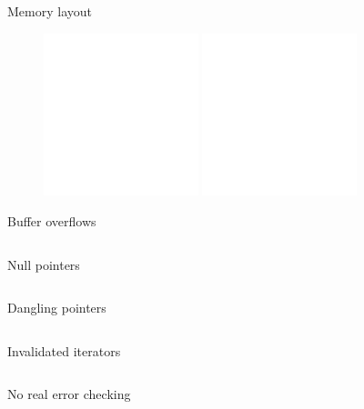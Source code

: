\documentclass[usenames,dvipsnames,10pt,aspectratio=169]{beamer}
\begin{document}
\begin{frame}{Memory layout} 

\begin{figure}[ht]
	\includegraphics[width=0.4\textwidth]{graphics/stack1.png}
  \hfill
	\includegraphics[width=0.4\textwidth]{graphics/stack2.png}
	\hfill
\end{figure}
	
\end{frame}

\begin{frame}{Buffer overflows} 
	\inputminted[fontsize=\large]{c}{code/overflow.c}
\end{frame}

\begin{frame}{Null pointers}
	\inputminted[fontsize=\large]{c}{code/nullp.c}
\end{frame}

\begin{frame}{Dangling pointers} 
	\inputminted[fontsize=\large]{c}{code/danp.c}
\end{frame}

\begin{frame}{Invalidated iterators} 
	\inputminted[fontsize=\large]{c}{code/iter.c}
\end{frame}

\begin{frame}{No real error checking} 
	\inputminted[fontsize=\large]{c}{code/errorcheck.c}
\end{frame}
\end{document}
